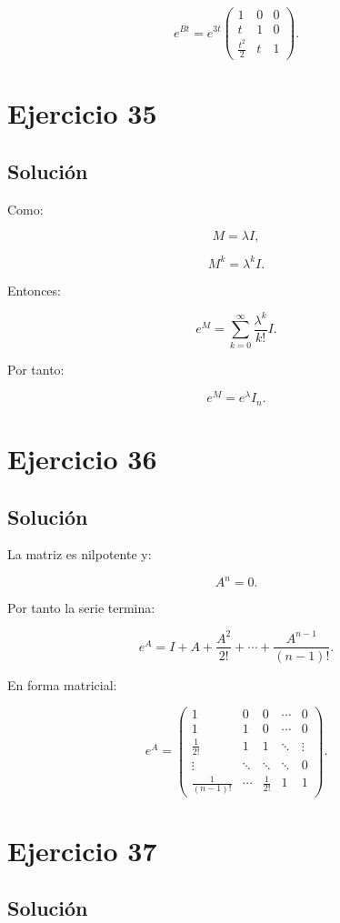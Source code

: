 \documentclass[11pt,a4paper]{article}
\begin{document}
\[
\boxed{
e^{Bt}
=
e^{3t}
\begin{pmatrix}
1&0&0\\
t&1&0\\
\frac{t^2}{2}&t&1
\end{pmatrix}.
}
\]

\section{Ejercicio 35}
\subsection{Solución}

Como:

\[
M=\lambda I,
\]

\[
M^k=\lambda^kI.
\]

Entonces:

\[
e^M
=
\sum_{k=0}^\infty
\frac{\lambda^k}{k!}I.
\]

Por tanto:

\[
\boxed{
e^M=e^\lambda I_n.
}
\]

\section{Ejercicio 36}
\subsection{Solución}

La matriz es nilpotente y:

\[
A^n=0.
\]

Por tanto la serie termina:

\[
\boxed{
e^A
=
I+A+\frac{A^2}{2!}
+\cdots+
\frac{A^{n-1}}{(n-1)!}.
}
\]

En forma matricial:

\[
\boxed{
e^A=
\begin{pmatrix}
1&0&0&\cdots&0\\
1&1&0&\cdots&0\\
\frac1{2!}&1&1&\ddots&\vdots\\
\vdots&\ddots&\ddots&\ddots&0\\
\frac1{(n-1)!}&\cdots&\frac1{2!}&1&1
\end{pmatrix}.
}
\]

\section{Ejercicio 37}
\subsection{Solución}
\end{document}
